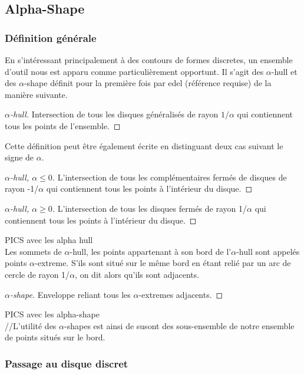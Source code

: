 \subsection{Alpha-Shape}

\subsubsection{Définition générale}

En s'intéressant principalement à des contours de formes discretes, un ensemble d'outil nous est apparu comme particulièrement opportunt. Il s'agit des $\alpha$-hull et des $\alpha$-shape définit pour la première fois par edel (référence requise) de la manière suivante.

\begin{proof}[$\alpha$-hull]
	Intersection de tous les disques généralisés de rayon $1/\alpha$ qui contiennent tous les points de l'ensemble.
\end{proof}

Cette définition peut être également écrite en distinguant deux cas suivant le signe de $\alpha$.

\begin{proof}[$\alpha$-hull, $\alpha \leq 0$]
	L'intersection de tous les complémentaires fermés de disques de rayon -1/$\alpha$ qui contiennent tous les points à l’intérieur du disque.
\end{proof}

\begin{proof}[$\alpha$-hull, $\alpha \geq 0$]
  	L'intersection de tous les disques fermés de rayon 1/$\alpha$ qui contiennent tous les points à l’intérieur du disque.
\end{proof}

PICS avec les alpha hull\\

Les sommets de $\alpha$-hull, les points appartenant à son bord de l'$\alpha$-hull sont appelés points $\alpha$-extreme. S'ils sont situé sur le même bord en étant relié par un arc de cercle de rayon 1/$\alpha$, on dit alors qu'ils sont adjacents.

\begin{proof}[$\alpha$-shape]
  	Enveloppe reliant tous les $\alpha$-extremes adjacents.
\end{proof}

PICS avec les alpha-shape\\

//L'utilité des $\alpha$-shapes est ainsi de susont des sous-ensemble de notre ensemble de points situés sur le bord. 

\subsubsection{Passage au disque discret}







